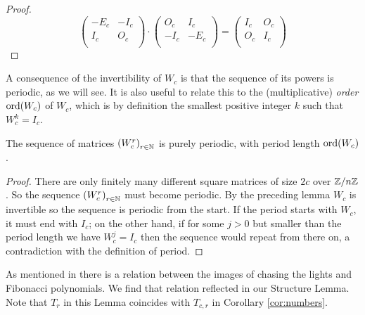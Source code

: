\begin{proof}
  \[
  \left(
  \begin{array}{cc}
    -E_c & -I_c \\
     I_c &  O_c \\
  \end{array}
  \right)
  \cdot
  \left(
  \begin{array}{cc}
     O_c &  I_c  \\
    -I_c & -E_c \\
  \end{array}
  \right)
  =
  \left(
  \begin{array}{cc}
    I_c & O_c \\
    O_c & I_c \\
  \end{array}
  \right)
  \]
\end{proof}
%
A consequence of the invertibility of $W_{c}$ is that the sequence of its powers
is periodic, as we will see. It is also useful to relate this to the
(multiplicative) {\it order} $\operatorname{ord}(W_c)$ of $W_c$,
which is by definition the smallest
positive integer $k$ such that $W_c^k=I_c$.

\begin{theorem}\label{thm:Wperiod}
The sequence of matrices $\left(W_{c}^{r}\right)_{r\in\mathbb{N}}$ is purely periodic, with
period length $\operatorname{ord}(W_c)$.
\end{theorem}

\begin{proof}
  There are only finitely many different square matrices of size $2c$ over
  $\mathbb{Z}/n\mathbb{Z}$. So the sequence $\left(W_{c}^{r}\right)_{r\in\mathbb{N}}$ must
  become periodic. By the preceding lemma $W_{c}$ is invertible so the
  sequence is periodic from the start. If the period starts with $W_c$, it
  must end with $I_c$; on the other hand, if for some $j>0$ but smaller than
  the period length we have $W_c^j=I_c$ then the sequence would repeat from
there on, a contradiction with the definition of period.
\end{proof}
%
As mentioned in \cite{leach17} there is a relation between the images of chasing
the lights and Fibonacci polynomials. We find that relation reflected in our
Structure Lemma. Note that $T_r$ in this Lemma coincides with
$T_{c,r}$ in Corollary \ref{cor:numbers}.


